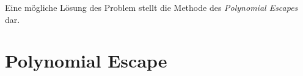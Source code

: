 Eine mögliche Lösung des Problem stellt die Methode des \textit{Polynomial Escapes} dar.
\section{Polynomial Escape}







